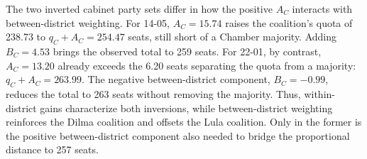 \documentclass[11pt]{article}
\begin{document}



The two inverted cabinet party sets differ in how the positive \(A_C\)
interacts with between-district weighting. For 14-05, \(A_C=15.74\)
raises the coalition's quota of 238.73 to \(q_C+A_C=254.47\) seats,
still short of a Chamber majority. Adding \(B_C=4.53\) brings the
observed total to 259 seats. For 22-01, by contrast, \(A_C=13.20\)
already exceeds the 6.20 seats separating the quota from a majority:
\(q_C+A_C=263.99\). The negative between-district component,
\(B_C=-0.99\), reduces the total to 263 seats without removing the
majority. Thus, within-district gains characterize both inversions, while
between-district weighting reinforces the Dilma coalition and offsets the
Lula coalition. Only in the former is the positive between-district
component also needed to bridge the proportional distance to 257 seats.

\end{document}

